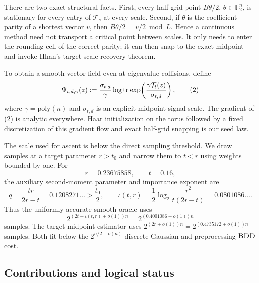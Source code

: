 \documentclass[10pt]{article}
\theoremstyle{definition}
\newcommand{\F}{\mathbb{F}}
\newcommand{\tr}{\mathop{\rm tr}}
\newcommand{\poly}{\mathrm{poly}}
\newcommand{\BDD}{\textnormal{\textsc{BDD}}}
\newcommand{\cT}{\mathcal{T}}
\begin{document}
There are two exact structural facts.  First, every half-grid point
$B\theta/2$, $\theta\in\F_2^n$, is stationary for every entry of $\cT_s$ at
every scale.  Second, if $\theta$ is the coefficient parity of a shortest
vector $v$, then $B\theta/2=v/2\bmod L$.  Hence a continuous method need not
transport a critical point between scales.  It only needs to enter the
rounding cell of the correct parity; it can then snap to the exact midpoint
and invoke Hhan's target-scale recovery theorem.

To obtain a smooth vector field even at eigenvalue collisions, define
\[
 \Psi_{t,d,\gamma}(z)
 :=\frac{\sigma_{t,d}}{\gamma}
   \log\tr\exp\!\left(\frac{\gamma\cT_t(z)}{\sigma_{t,d}}\right),       \tag{2}
\]
where $\gamma=\poly(n)$ and $\sigma_{t,d}$ is an explicit midpoint signal
scale.  The gradient of (2) is analytic everywhere.  Haar initialization on
the torus followed by a fixed discretization of this gradient flow and exact
half-grid snapping is our seed law.

The scale used for ascent is below the direct sampling threshold.  We draw
samples at a target parameter $r>t_0$ and narrow them to $t<r$ using weights
bounded by one.  For
\[
 r=0.23675858,\qquad t=0.16,
\]
the auxiliary second-moment parameter and importance exponent are
\[
 q=\frac{tr}{2r-t}=0.1208271\ldots>\frac{t_0}{2},\qquad
 \iota(t,r)=\frac12\log_2\frac{r^2}{t(2r-t)}=0.0801086\ldots.          \tag{3}
\]
Thus the uniformly accurate smooth oracle uses
\[
 2^{(2t+\iota(t,r)+o(1))n}=2^{(0.4001086+o(1))n}                     \tag{4}
\]
samples.  The target midpoint estimator uses
$2^{(2r+o(1))n}=2^{(0.4735172+o(1))n}$ samples.  Both fit below the
$2^{n/2+o(n)}$ discrete-Gaussian and preprocessing-$\BDD$ cost.

\subsection{Contributions and logical status}
\end{document}
